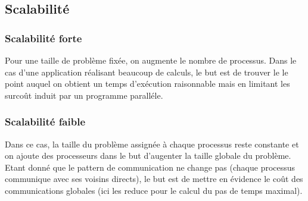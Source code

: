 





\subsection{Scalabilité}

\subsubsection{Scalabilité forte}
Pour une taille de problème fixée, on augmente le nombre de processus. Dans le cas d'une application réalisant beaucoup de calculs, le but est de trouver le le point auquel on obtient un temps d'exécution raisonnable mais en limitant les surcoût induit par un programme paralléle. 	

\subsubsection{Scalabilité faible}
Dans ce cas, la taille du problème assignée à chaque processus reste constante et on ajoute des processeurs dans le but d'augenter la taille globale du problème. Etant donné que le pattern de communication ne change pas (chaque processus communique avec ses voisins directs), le but est de mettre en évidence le coût des communications globales (ici les reduce pour le calcul du pas de temps maximal).


